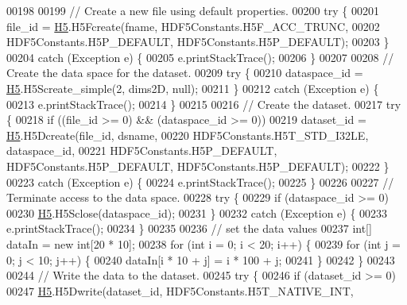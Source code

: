 \begin{DoxyCode}
00198 
00199         \textcolor{comment}{// Create a new file using default properties.}
00200         \textcolor{keywordflow}{try} \{
00201             file\_id = \hyperlink{namespace_h5}{H5}.H5Fcreate(fname, HDF5Constants.H5F\_ACC\_TRUNC,
00202                     HDF5Constants.H5P\_DEFAULT, HDF5Constants.H5P\_DEFAULT);
00203         \}
00204         \textcolor{keywordflow}{catch} (Exception e) \{
00205             e.printStackTrace();
00206         \}
00207 
00208         \textcolor{comment}{// Create the data space for the dataset.}
00209         \textcolor{keywordflow}{try} \{
00210             dataspace\_id = \hyperlink{namespace_h5}{H5}.H5Screate\_simple(2, dims2D, null);
00211         \}
00212         \textcolor{keywordflow}{catch} (Exception e) \{
00213             e.printStackTrace();
00214         \}
00215 
00216         \textcolor{comment}{// Create the dataset.}
00217         \textcolor{keywordflow}{try} \{
00218             \textcolor{keywordflow}{if} ((file\_id >= 0) && (dataspace\_id >= 0))
00219                 dataset\_id = \hyperlink{namespace_h5}{H5}.H5Dcreate(file\_id, dsname,
00220                         HDF5Constants.H5T\_STD\_I32LE, dataspace\_id,
00221                         HDF5Constants.H5P\_DEFAULT, HDF5Constants.H5P\_DEFAULT, HDF5Constants.H5P\_DEFAULT);
00222         \}
00223         \textcolor{keywordflow}{catch} (Exception e) \{
00224             e.printStackTrace();
00225         \}
00226 
00227         \textcolor{comment}{// Terminate access to the data space.}
00228         \textcolor{keywordflow}{try} \{
00229             \textcolor{keywordflow}{if} (dataspace\_id >= 0)
00230                 \hyperlink{namespace_h5}{H5}.H5Sclose(dataspace\_id);
00231         \}
00232         \textcolor{keywordflow}{catch} (Exception e) \{
00233             e.printStackTrace();
00234         \}
00235 
00236         \textcolor{comment}{// set the data values}
00237         \textcolor{keywordtype}{int}[] dataIn = \textcolor{keyword}{new} \textcolor{keywordtype}{int}[20 * 10];
00238         \textcolor{keywordflow}{for} (\textcolor{keywordtype}{int} i = 0; i < 20; i++) \{
00239             \textcolor{keywordflow}{for} (\textcolor{keywordtype}{int} j = 0; j < 10; j++) \{
00240                 dataIn[i * 10 + j] = i * 100 + j;
00241             \}
00242         \}
00243 
00244         \textcolor{comment}{// Write the data to the dataset.}
00245         \textcolor{keywordflow}{try} \{
00246             \textcolor{keywordflow}{if} (dataset\_id >= 0)
00247                 \hyperlink{namespace_h5}{H5}.H5Dwrite(dataset\_id, HDF5Constants.H5T\_NATIVE\_INT,

\end{DoxyCode}
